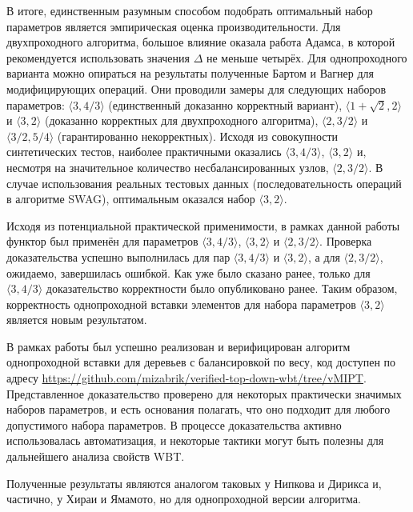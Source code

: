 \documentclass[a4paper,14pt]{extarticle}
\begin{document}
В итоге, единственным разумным способом
подобрать оптимальный набор параметров
является эмпирическая оценка производительности.
Для двухпроходного алгоритма,
большое влияние оказала работа Адамса\cite{adams},
в которой рекомендуется использовать
значения \( \Delta \) не меньше четырёх.
Для однопроходного варианта
можно опираться на результаты полученные
Бартом и Вагнер для модифицирующих операций\cite{barth}.
Они проводили замеры для следующих наборов параметров:
\( \langle 3, 4/3 \rangle \)
(единственный доказанно корректный вариант),
\( \langle 1 + \sqrt{2}, 2 \rangle \) и
\( \langle 3, 2 \rangle \)
(доказанно корректных для двухпроходного алгоритма),
\( \langle 2, 3/2 \rangle \) и
\( \langle 3/2, 5/4 \rangle \)
(гарантированно некорректных).
Исходя из совокупности синтетических тестов,
наиболее практичными
оказались \( \langle 3, 4/3 \rangle \),
\( \langle 3, 2 \rangle \)
и, несмотря на значительное количество несбалансированных узлов,
\( \langle 2, 3/2 \rangle \).
В случае использования реальных тестовых данных
(последовательность операций в алгоритме SWAG\cite{swag}),
оптимальным оказался набор \( \langle 3, 2 \rangle \).

Исходя из потенциальной практической применимости,
в рамках данной работы 
функтор  был применён
для параметров
\( \langle 3, 4/3 \rangle \), \( \langle 3, 2 \rangle \)
и \( \langle 2, 3/2 \rangle \).
Проверка доказательства успешно выполнилась
для пар \( \langle 3, 4/3 \rangle \)
и \( \langle 3, 2 \rangle \),
а для \( \langle 2, 3/2 \rangle \),
ожидаемо, завершилась ошибкой.
Как уже было сказано ранее,
только для \( \langle 3, 4/3 \rangle \) 
доказательство корректности было опубликовано ранее.
Таким образом, корректность
однопроходной вставки элементов
для набора параметров \( \langle 3, 2 \rangle \)
является новым результатом.

\clearpage
{}

В рамках работы был успешно реализован и верифицирован алгоритм однопроходной
вставки для деревьев с балансировкой по весу,
код доступен по адресу \url{https://github.com/mizabrik/verified-top-down-wbt/tree/vMIPT}.
Представленное доказательство проверено для некоторых практически значимых наборов параметров,
и есть основания полагать, что оно подходит для любого допустимого набора параметров.
В процессе доказательства активно использовалась автоматизация,
и некоторые тактики могут быть полезны для дальнейшего анализа свойств WBT.

Полученные результаты
являются аналогом таковых у Нипкова и Дирикса\cite{nipkow}
и, частично, у Хираи и Ямамото\cite{hirai},
но для однопроходной версии алгоритма.
\end{document}
